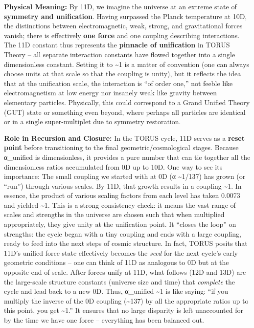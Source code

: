 \documentclass[
]{article}
\begin{document}
\textbf{Physical Meaning:} By 11D, we imagine the universe at an extreme
state of \textbf{symmetry and unification}. Having surpassed the Planck
temperature at 10D, the distinctions between electromagnetic, weak,
strong, and gravitational forces vanish; there is effectively
\textbf{one force} and one coupling describing interactions\hspace{0pt}.
The 11D constant thus represents the \textbf{pinnacle of unification} in
TORUS Theory -- all separate interaction constants have flowed together
into a single dimensionless constant. Setting it to \textasciitilde1 is
a matter of convention (one can always choose units at that scale so
that the coupling is unity), but it reflects the idea that at the
unification scale, the interaction is ``of order one,'' not feeble like
electromagnetism at low energy nor insanely weak like gravity between
elementary particles. Physically, this could correspond to a Grand
Unified Theory (GUT) state or something even beyond, where perhaps all
particles are identical or in a single super-multiplet due to symmetry
restoration\hspace{0pt}.

\textbf{Role in Recursion and Closure:} In the TORUS cycle, 11D serves
as a \textbf{reset point} before transitioning to the final
geometric/cosmological stages. Because α\_unified is dimensionless, it
provides a pure number that can tie together all the dimensionless
ratios accumulated from 0D up to 10D. One way to see its importance: The
small coupling we started with at 0D (α \textasciitilde1/137) has grown
(or ``run'') through various scales. By 11D, that growth results in a
coupling \textasciitilde1. In essence, the product of various scaling
factors from each level has taken 0.0073 and yielded
\textasciitilde1\hspace{0pt}. This is a strong consistency check: it
means the vast range of scales and strengths in the universe are chosen
such that when multiplied appropriately, they give unity at the
unification point. It ``closes the loop'' on strengths: the cycle began
with a tiny coupling and ends with a large coupling, ready to feed into
the next steps of cosmic structure\hspace{0pt}. In fact, TORUS posits
that 11D's unified force state effectively becomes the \emph{seed} for
the next cycle's early geometric conditions -- one can think of 11D as
analogous to 0D but at the opposite end of scale\hspace{0pt}. After
forces unify at 11D, what follows (12D and 13D) are the large-scale
structure constants (universe size and time) that \emph{complete} the
cycle and lead back to a new 0D. Thus, α\_unified \textasciitilde1 is
like saying: ``if you multiply the inverse of the 0D coupling
(\textasciitilde137) by all the appropriate ratios up to this point, you
get \textasciitilde1.'' It ensures that no large disparity is left
unaccounted for by the time we have one force -- everything has been
balanced out.
\end{document}
